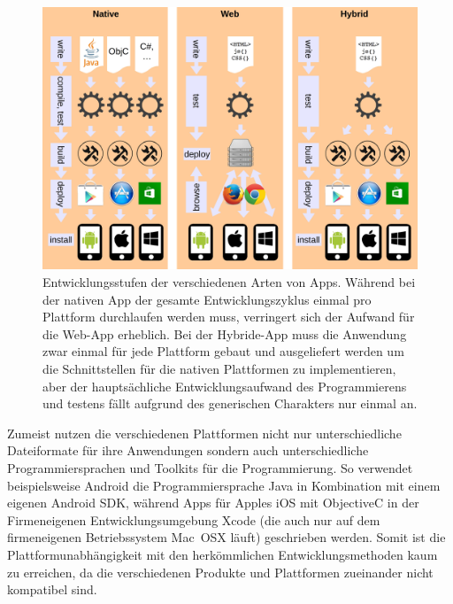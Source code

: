 \begin{figure}
\centering
\includegraphics[width=1\linewidth]{./images/hybrid-apps-schaubild}
\caption[Schaubild Hybrid Apps]{Entwicklungsstufen der verschiedenen Arten von Apps. Während bei der nativen App der gesamte Entwicklungszyklus einmal pro Plattform durchlaufen werden muss, verringert sich der Aufwand für die Web-App erheblich. Bei der Hybride-App muss die Anwendung zwar einmal für jede Plattform gebaut und ausgeliefert werden um die Schnittstellen für die nativen Plattformen zu implementieren, aber der hauptsächliche Entwicklungsaufwand des Programmierens und testens fällt aufgrund des generischen Charakters nur einmal an.}
\label{fig:hybrid-apps-schaubild}
\end{figure}



Zumeist nutzen die verschiedenen Plattformen nicht nur unterschiedliche Dateiformate für ihre Anwendungen sondern auch unterschiedliche Programmiersprachen und Toolkits für die Programmierung. So verwendet beispielsweise Android die Programmiersprache Java in Kombination mit einem eigenen Android SDK, während Apps für Apples iOS mit ObjectiveC in der Firmeneigenen Entwicklungsumgebung Xcode (die auch nur auf dem firmeneigenen Betriebssystem Mac~OSX läuft) geschrieben werden. Somit ist die Plattformunabhängigkeit mit den herkömmlichen Entwicklungsmethoden kaum zu erreichen, da die verschiedenen Produkte und Plattformen zueinander nicht kompatibel sind.

